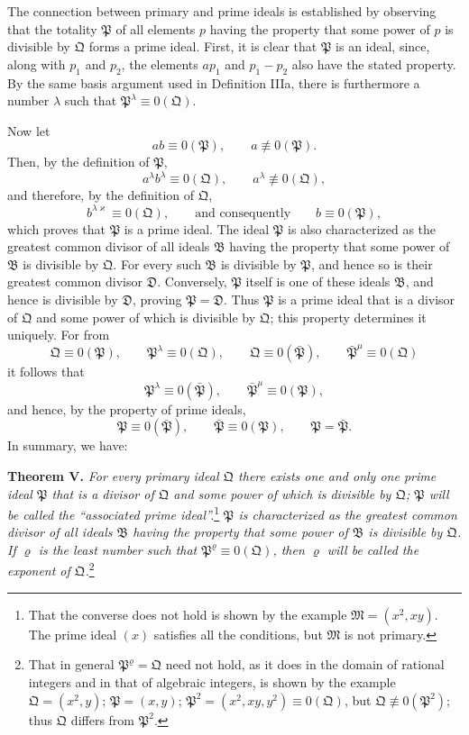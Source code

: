 \documentclass[11pt]{article}
\providecommand{\ideal}[1]{\mathfrak{#1}}
\begin{document}
The connection between primary and prime ideals is established by observing that the totality $\ideal P$ of all elements $p$ having the property that some power of $p$ is divisible by $\ideal Q$ forms a prime ideal. First, it is clear that $\ideal P$ is an ideal, since, along with $p_1$ and $p_2$, the elements $ap_1$ and $p_1-p_2$ also have the stated property. By the same basis argument used in Definition IIIa, there is furthermore a number $\lambda$ such that $\ideal P^\lambda\equiv0(\ideal Q)$.

Now let
\[
 ab\equiv0(\ideal P),\qquad a\not\equiv0(\ideal P).
\]
Then, by the definition of $\ideal P$,
\[
 a^\lambda b^\lambda\equiv0(\ideal Q),\qquad a^\lambda\not\equiv0(\ideal Q),
\]
and therefore, by the definition of $\ideal Q$,
\[
 b^{\lambda\varkappa}\equiv0(\ideal Q),\qquad\text{and consequently}\qquad b\equiv0(\ideal P),
\]
which proves that $\ideal P$ is a prime ideal. The ideal $\ideal P$ is also characterized as the greatest common divisor of all ideals $\ideal B$ having the property that some power of $\ideal B$ is divisible by $\ideal Q$. For every such $\ideal B$ is divisible by $\ideal P$, and hence so is their greatest common divisor $\ideal D$. Conversely, $\ideal P$ itself is one of these ideals $\ideal B$, and hence is divisible by $\ideal D$, proving $\ideal P=\ideal D$. Thus $\ideal P$ is a prime ideal that is a divisor of $\ideal Q$ and some power of which is divisible by $\ideal Q$; this property determines it uniquely. For from
\[
 \ideal Q\equiv0(\ideal P),\qquad \ideal P^\lambda\equiv0(\ideal Q),
 \qquad
 \ideal Q\equiv0(\bar{\ideal P}),\qquad \bar{\ideal P}^{\mu}\equiv0(\ideal Q)
\]
it follows that
\[
 \ideal P^\lambda\equiv0(\bar{\ideal P}),\qquad
 \bar{\ideal P}^{\mu}\equiv0(\ideal P),
\]
and hence, by the property of prime ideals,
\[
 \ideal P\equiv0(\bar{\ideal P}),\qquad
 \bar{\ideal P}\equiv0(\ideal P),\qquad
 \ideal P=\bar{\ideal P}.
\]
In summary, we have:

\textbf{Theorem V.} \emph{For every primary ideal $\ideal Q$ there exists one and only one prime ideal $\ideal P$ that is a divisor of $\ideal Q$ and some power of which is divisible by $\ideal Q$; $\ideal P$ will be called the ``associated prime ideal''.}\footnote{That the converse does not hold is shown by the example $\ideal M=(x^2,xy)$. The prime ideal $(x)$ satisfies all the conditions, but $\ideal M$ is not primary.} \emph{$\ideal P$ is characterized as the greatest common divisor of all ideals $\ideal B$ having the property that some power of $\ideal B$ is divisible by $\ideal Q$. If $\varrho$ is the least number such that $\ideal P^\varrho\equiv0(\ideal Q)$, then $\varrho$ will be called the exponent of $\ideal Q$.}\footnote{That in general $\ideal P^\varrho=\ideal Q$ need not hold, as it does in the domain of rational integers and in that of algebraic integers, is shown by the example $\ideal Q=(x^2,y)$; $\ideal P=(x,y)$; $\ideal P^2=(x^2,xy,y^2)\equiv0(\ideal Q)$, but $\ideal Q\not\equiv0(\ideal P^2)$; thus $\ideal Q$ differs from $\ideal P^2$.}
\end{document}
